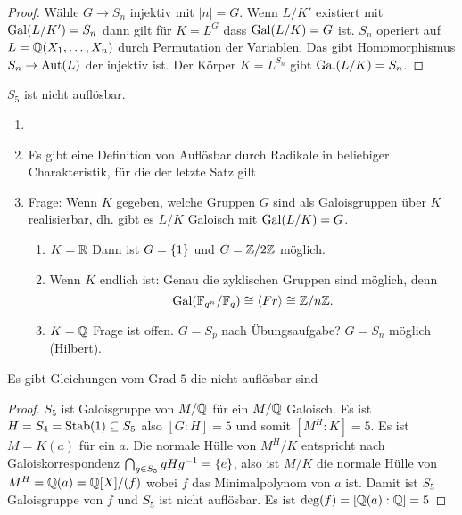 \begin{proof}
    Wähle \(G\to S_n\) injektiv mit \(|n|=G\). Wenn \(L/K'\) existiert mit \(\operatorname{Gal}(L/K')=S_n\) dann gilt für \(K=L^G\) dass \(\operatorname{Gal}(L/K)=G\) ist.
    \(S_n\) operiert auf \(L=\mathbb{Q}(X_1,\dots,X_n)\) durch Permutation der Variablen. Das gibt Homomorphismus \(S_n\to\operatorname{Aut}(L)\) der injektiv ist. Der Körper \(K=L^{S_n}\) gibt \(\operatorname{Gal}(L/K)=S_n\).
\end{proof}
\begin{Bem}
    \(S_5\) ist nicht auflösbar. 
\end{Bem}
\begin{Bem}
    \begin{enumerate}
        \item[]
        \item Es gibt eine Definition von Auflösbar durch Radikale in beliebiger Charakteristik, für die der letzte Satz gilt
        \item Frage: Wenn \(K\) gegeben, welche Gruppen \(G\) sind als Galoisgruppen über \(K\) realisierbar, dh. gibt es \(L/K\) Galoisch mit \(\operatorname{Gal}(L/K)=G\).
        \begin{enumerate}
            \item \(K=\mathbb{R}\) Dann ist \(G=\{1\}\) und \(G=\mathbb{Z}/2\mathbb{Z}\) möglich.
            \item Wenn \(K\) endlich ist: Genau die zyklischen Gruppen sind möglich, denn \[\operatorname{Gal}(\mathbb{F}_{q^n}/\mathbb{F}_q)\cong\langle Fr\rangle\cong\mathbb{Z}/n\mathbb{Z}.\]
            \item \(K=\mathbb{Q}\) Frage ist offen. \(G=S_p\) nach Übungsaufgabe?
            \(G=S_n\) möglich (Hilbert).
        \end{enumerate}
    \end{enumerate}
\end{Bem}
\begin{Satz}
    Es gibt Gleichungen vom Grad \(5\) die nicht auflösbar sind
    \end{Satz}
    \begin{proof}
        \(S_5\) ist Galoisgruppe von \(M/\mathbb{Q}\) für ein \(M/\mathbb{Q}\) Galoisch. Es ist \(H=S_4=\operatorname{Stab}(1)\subseteq S_5\) also \([G:H]=5\) und somit \([M^H:K]=5\). Es ist \(M=K(a)\) für ein \(a\). Die normale Hülle von \(M^H/K\) entspricht nach Galoiskorrespondenz \(\bigcap_{g\in S_5}gHg^{-1}=\{e\}\), also ist \(M/K\) die normale Hülle von \(M^H=\mathbb{Q}(a)=\mathbb{Q}[X]/(f)\) wobei \(f\) das Minimalpolynom von \(a\) ist. Damit ist \(S_5\) Galoisgruppe von \(f\) und \(S_5\) ist nicht auflösbar. Es ist \(\deg(f)=[\mathbb{Q}(a):\mathbb{Q}]=5\)
    \end{proof}